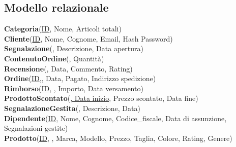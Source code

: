 \subsection{Modello relazionale}

\textbf{Categoria}(\uline{ID}, Nome, Articoli totali)\\
\textbf{Cliente}(\uline{ID}, Nome, Cognome, Email, Hash Password)\\
\textbf{Segnalazione}(, Descrizione, Data apertura)\\
\textbf{ContenutoOrdine}(\uline{}, Quantità)\\
\textbf{Recensione}(\uline{}, Data, Commento, Rating)\\
\textbf{Ordine}(\uline{ID},, Data, Pagato, Indirizzo spedizione)\\
\textbf{Rimborso}(\uline{ID}, , Importo, Data versamento)\\
\textbf{ProdottoScontato}(\uline{, Data inizio}, Prezzo scontato, Data fine)\\
\textbf{SegnalazioneGestita}(\uline{}, Descrizione, Data)\\
\textbf{Dipendente}(\uline{ID}, Nome, Cognome, Codice\_fiscale, Data di assunzione, Segnalazioni gestite)\\
\textbf{Prodotto}(\uline{ID}, , Marca,  Modello, Prezzo, Taglia, Colore, Rating, Genere)\\
